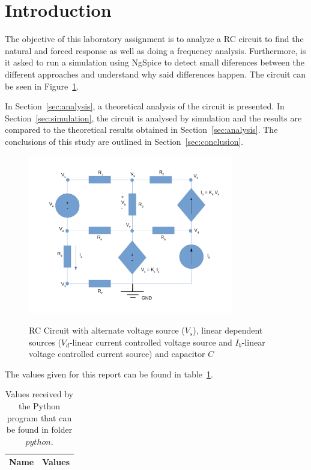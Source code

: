 \newpage
\section{Introduction}
\label{sec:introduction}


The objective of this laboratory assignment is to analyze a RC circuit to find the natural and forced response as well as doing a frequency analysis. Furthermore, is it asked to run a simulation using NgSpice to detect small diferences between the different approaches and understand why said differences happen. The circuit can be seen in Figure~\ref{fig:circuit}.

In Section~\ref{sec:analysis}, a theoretical analysis of the circuit is
presented. In Section~\ref{sec:simulation}, the circuit is analysed by
simulation and the results are compared to the theoretical results obtained in
Section~\ref{sec:analysis}. The conclusions of this study are outlined in
Section~\ref{sec:conclusion}.

\begin{figure}[h!] \centering
\caption{RC Circuit with alternate voltage source ($V_s$), linear dependent sources ($V_d$-linear current controlled voltage source and $I_b$-linear voltage controlled current source) and capacitor $C$}
\squeezeup
\includegraphics[width=0.8\textwidth, scale=1.0]{circuit.pdf}
\squeezeup 
\label{fig:circuit}
\end{figure}

The values given for this report can be found in table~\ref{tab:op1}.

\begin{table}[hb]
  \centering
  \begin{tabular}{|l|r|}
    \hline    
    {\bf Name} & {\bf Values} \\ \hline
    
  \end{tabular}
  \caption{Values received by the Python program that can be found in folder $python$.}
  \label{tab:op1}
\end{table}


